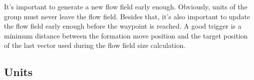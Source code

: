 \documentclass[a4paper,10pt]{article}
\begin{document}
It's important to generate a new flow field early enough.
Obviously, units of the group must never leave the flow field.
Besides that, it's also important to update the flow field early enough before the waypoint is reached.
A good trigger is a minimum distance between the formation move position and the target position of the last vector used during the flow field size calculation.


\subsection{Units}
\end{document}
